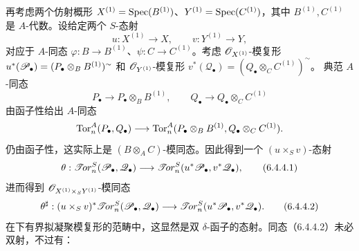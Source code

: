 再考虑两个仿射概形 $X^{(1)}=\operatorname{Spec}(B^{(1)})$、$Y^{(1)}=\operatorname{Spec}(C^{(1)})$，其中 $B^{(1)},C^{(1)}$ 是 $A$-代数。设给定两个 $S$-态射
\[
 u:X^{(1)}\longrightarrow X,\qquad v:Y^{(1)}\longrightarrow Y,
\]
对应于 $A$-同态 $\varphi:B\to B^{(1)}$、$\psi:C\to C^{(1)}$。考虑 $\mathscr O_{X^{(1)}}$-模复形
$u^*(\mathscr P_\bullet)=(P_\bullet\otimes_B B^{(1)})^{\sim}$ 和 $\mathscr O_{Y^{(1)}}$-模复形
$v^*(\mathscr Q_\bullet)=(Q_\bullet\otimes_C C^{(1)})^{\sim}$。
典范 $A$-同态
\[
 P_\bullet\longrightarrow P_\bullet\otimes_B B^{(1)},\qquad
 Q_\bullet\longrightarrow Q_\bullet\otimes_C C^{(1)}
\]
由函子性给出 $A$-同态
\[
 \operatorname{Tor}_n^A(P_\bullet,Q_\bullet)\longrightarrow
 \operatorname{Tor}_n^A(P_\bullet\otimes_B B^{(1)},Q_\bullet\otimes_C C^{(1)}).
\]
仍由函子性，这实际上是 $(B\otimes_A C)$-模同态。因此得到一个 $(u\times_S v)$-态射
\begin{equation}
 \theta:\mathscr{T}\!or_n^S(\mathscr P_\bullet,\mathscr Q_\bullet)
 \longrightarrow\mathscr{T}\!or_n^S(u^*\mathscr P_\bullet,v^*\mathscr Q_\bullet),
 \tag{6.4.4.1}
\end{equation}
进而得到 $\mathscr O_{X^{(1)}\times_S Y^{(1)}}$-模同态
\begin{equation}
 \theta^\sharp:(u\times_S v)^*\mathscr{T}\!or_n^S(\mathscr P_\bullet,\mathscr Q_\bullet)
 \longrightarrow\mathscr{T}\!or_n^S(u^*\mathscr P_\bullet,v^*\mathscr Q_\bullet).
 \tag{6.4.4.2}
\end{equation}
在下有界拟凝聚模复形的范畴中，这显然是双 $\delta$-函子的态射。同态（6.4.4.2）未必双射，不过有：

